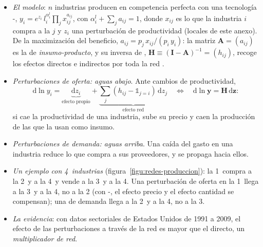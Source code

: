 \documentclass[11pt]{article}
\begin{document}
\begin{itemize}
\item \emph{El modelo}\nocite{AcemogluAkcigitKerr2016}: $n$ industrias producen en competencia perfecta con una tecnología -, $y_i=e^{z_i}\,l_i^{\alpha^l_i}\prod_j x_{ij}^{a_{ij}}$, con $\alpha^l_i+\sum_j a_{ij}=1$, donde $x_{ij}$ es lo que la industria $i$ compra a la $j$ y $z_i$ una perturbación de productividad (locales de este anexo). De la maximización del beneficio, $a_{ij}=p_j\,x_{ij}/(p_i\,y_i)$: la matriz $\mathbf A=(a_{ij})$ es la de \emph{insumo-producto}, y su inversa de , $\mathbf H\equiv(\mathbf I-\mathbf A)^{-1}=(h_{ij})$, recoge los efectos directos e indirectos por toda la red .
\item \emph{Perturbaciones de oferta: aguas abajo}. Ante cambios de productividad,
  \begin{equation*}
  \mathrm{d}\ln y_i=\underbrace{\mathrm{d}z_i}_{\text{efecto propio}}+\underbrace{\sum_{j}(h_{ij}-\mathbb 1_{j=i})\,\mathrm{d}z_j}_{\text{efecto red}}\quad\Longleftrightarrow\quad \mathrm{d}\ln\mathbf y=\mathbf H\,\mathrm{d}\mathbf z :
  \end{equation*}
  si cae la productividad de una industria, sube su precio y caen la producción de las que la usan como insumo.
\item \emph{Perturbaciones de demanda: aguas arriba}. Una caída del gasto en una industria reduce lo que compra a sus proveedores, y se propaga hacia ellos.
\item \emph{Un ejemplo con 4~industrias} (figura~\ref{figu:redes-produccion}): la 1~compra a la 2~y a la 4~y vende a la 3~y a la 4. Una perturbación de oferta en la 1~llega a la 3~y a la 4, no a la 2 (con -, el efecto precio y el efecto cantidad se compensan); una de demanda llega a la 2~y a la 4, no a la 3.
\item \emph{La evidencia}: con datos sectoriales de Estados Unidos de 1991 a 2009, el efecto de las perturbaciones a través de la red es mayor que el directo, un \emph{multiplicador de red}.
\end{itemize}

\begin{infografia}[H]
\centering
\caption{Una red de producción de 4~industrias}\label{figu:redes-produccion}
\end{infografia}
\end{document}
